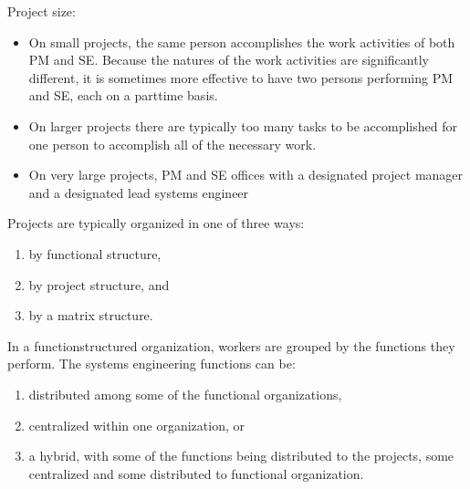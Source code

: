 \documentclass[letterpaper,10pt,english]{jupyterBook}
\begin{document}
\sphinxAtStartPar
Project size:
\begin{itemize}
\item {} 
\sphinxAtStartPar
On small projects, the same person accomplishes the work activities of both PM and SE.
Because the natures of the work activities are significantly different, it is sometimes more effective to have two persons performing PM and SE, each on a part\sphinxhyphen{}time basis.

\item {} 
\sphinxAtStartPar
On larger projects there are typically too many tasks to be accomplished for one person to accomplish all of the necessary
work.

\item {} 
\sphinxAtStartPar
On very large projects, PM and SE offices with a designated project manager and a designated lead systems engineer

\end{itemize}

\sphinxAtStartPar
Projects are typically organized in one of three ways:
\begin{enumerate}
%
\item {} 
\sphinxAtStartPar
by functional structure,

\item {} 
\sphinxAtStartPar
by project structure, and

\item {} 
\sphinxAtStartPar
by a matrix structure.

\end{enumerate}

\sphinxAtStartPar
In a function\sphinxhyphen{}structured organization, workers are grouped by the functions they perform. The systems engineering
functions can be:
\begin{enumerate}
%
\item {} 
\sphinxAtStartPar
distributed among some of the functional organizations,

\item {} 
\sphinxAtStartPar
centralized within one organization, or

\item {} 
\sphinxAtStartPar
a hybrid, with some of the functions being distributed to the projects, some centralized and some distributed to functional organization.

\end{enumerate}
\end{document}

